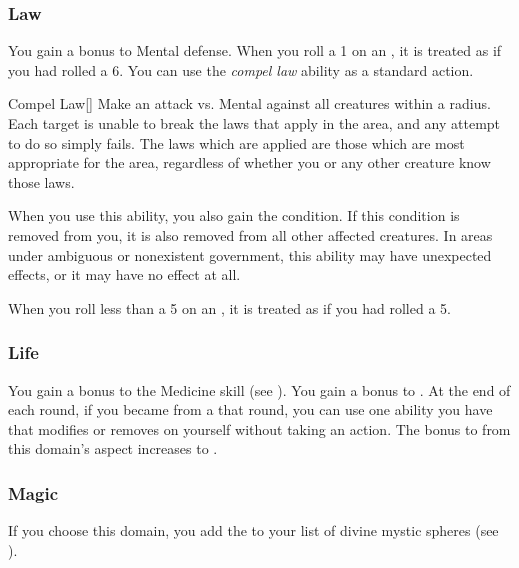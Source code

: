         \subsubsection{Law}
             You gain a  bonus to Mental defense.
             When you roll a 1 on an , it is treated as if you had rolled a 6.
             You can use the \textit{compel law} ability as a standard action.
            \begin{freeability}{Compel Law}[]
                Make an attack vs. Mental against all creatures within a \arealarge radius.
                \hit Each target is unable to break the laws that apply in the area, and any attempt to do so simply fails.
                The laws which are applied are those which are most appropriate for the area, regardless of whether you or any other creature know those laws.

                When you use this ability, you also gain the condition.
                If this condition is removed from you, it is also removed from all other affected creatures.
                In areas under ambiguous or nonexistent government, this ability may have unexpected effects, or it may have no effect at all.
            \end{freeability}
             When you roll less than a 5 on an , it is treated as if you had rolled a 5.

        \subsubsection{Life}
             You gain a  bonus to the Medicine skill (see ).
             You gain a  bonus to .
             At the end of each round, if you became  from a  that round, you can use one  ability you have that modifies  or removes  on yourself without taking an action.
             The bonus to  from this domain's aspect increases to .

        \subsubsection{Magic}
            If you choose this domain, you add the   to your list of divine mystic spheres (see ).

